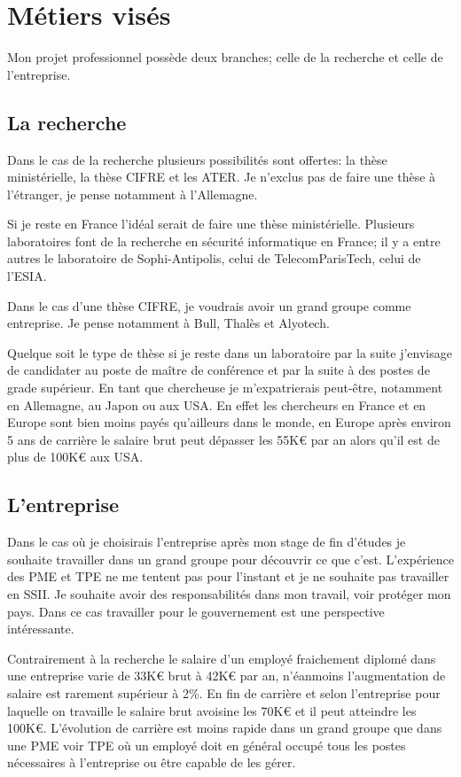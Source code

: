 \documentclass[a4paper,12pt]{article}
\begin{document}
\section{Métiers visés}
Mon projet professionnel possède deux branches; celle de la recherche et celle de l'entreprise. 

\subsection{La recherche}
Dans le cas de la recherche plusieurs possibilités sont offertes: la thèse ministérielle, la thèse CIFRE et les ATER. Je n'exclus pas de faire une thèse à l'étranger, je pense notamment à l'Allemagne. 

Si je reste en France l'idéal serait de faire une thèse ministérielle. Plusieurs laboratoires font de la recherche en sécurité informatique en France; il y a entre autres le laboratoire de Sophi-Antipolis, celui de TelecomParisTech, celui de l'ESIA.

Dans le cas d'une thèse CIFRE, je voudrais avoir un grand groupe comme entreprise. Je pense notamment à Bull, Thalès et Alyotech.

Quelque soit le type de thèse si je reste dans un laboratoire par la suite j'envisage de candidater au poste de ma\^itre de conférence et par la suite à des postes de grade supérieur. En tant que chercheuse je m'expatrierais peut-\^etre, notamment en Allemagne, au Japon ou aux USA. En effet les chercheurs en France et en Europe sont bien moins payés qu'ailleurs dans le monde, en Europe après environ 5 ans de carrière le salaire  brut peut dépasser les 55K€ par an alors qu'il est de plus de 100K€ aux USA.

\subsection{L'entreprise}
Dans le cas où je choisirais l'entreprise après mon stage de fin d'études je souhaite travailler dans un grand groupe pour découvrir ce que c'est. L'expérience des PME et TPE ne me tentent pas pour l'instant et je ne souhaite pas travailler en SSII. Je souhaite avoir des responsabilités dans mon travail, voir protéger mon pays. Dans ce cas travailler pour le gouvernement est une perspective intéressante. 

Contrairement à la recherche le salaire d'un employé fraichement diplomé dans une entreprise varie de 33K€ brut à 42K€ par an, n'éanmoins l'augmentation de salaire est rarement supérieur à 2\%. En fin de carrière et selon l'entreprise pour laquelle on travaille le salaire brut avoisine les 70K€ et il peut atteindre les 100K€. L'évolution de carrière est moins rapide dans un grand groupe que dans une PME voir TPE où un employé doit en général occupé tous les postes nécessaires à l'entreprise ou \^etre capable de les gérer. 
\end{document}
